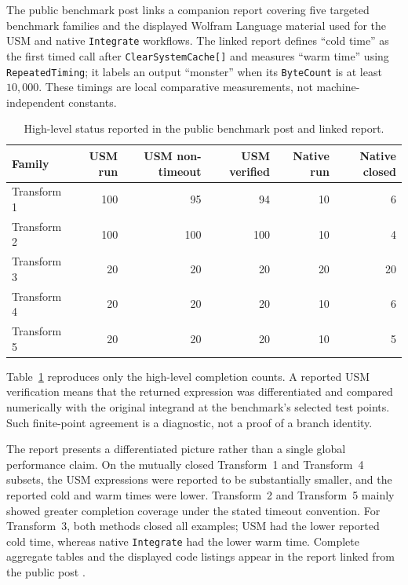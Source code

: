 \documentclass[11pt]{article}
\theoremstyle{remark}
\begin{document}
The public benchmark post \cite{GarciaBenchmark} links a companion report covering five targeted benchmark families and the displayed Wolfram Language material used for the USM and native \texttt{Integrate} workflows. The linked report defines ``cold time'' as the first timed call after \texttt{ClearSystemCache[]} and measures ``warm time'' using \texttt{RepeatedTiming}; it labels an output ``monster'' when its \texttt{ByteCount} is at least $10{,}000$. These timings are local comparative measurements, not machine-independent constants.

\begin{table}[htbp]
\centering
\caption{High-level status reported in the public benchmark post and linked report.}
\label{tab:benchmark}
\begin{tabular}{lrrrrr}
\toprule
Family & USM run & USM non-timeout & USM verified & Native run & Native closed\\
\midrule
Transform 1 & 100 & 95 & 94 & 10 & 6\\
Transform 2 & 100 & 100 & 100 & 10 & 4\\
Transform 3 & 20 & 20 & 20 & 20 & 20\\
Transform 4 & 20 & 20 & 20 & 10 & 6\\
Transform 5 & 20 & 20 & 20 & 10 & 5\\
\bottomrule
\end{tabular}
\end{table}

Table~\ref{tab:benchmark} reproduces only the high-level completion counts. A reported USM verification means that the returned expression was differentiated and compared numerically with the original integrand at the benchmark's selected test points. Such finite-point agreement is a diagnostic, not a proof of a branch identity.

The report presents a differentiated picture rather than a single global performance claim. On the mutually closed Transform~1 and Transform~4 subsets, the USM expressions were reported to be substantially smaller, and the reported cold and warm times were lower. Transform~2 and Transform~5 mainly showed greater completion coverage under the stated timeout convention. For Transform~3, both methods closed all examples; USM had the lower reported cold time, whereas native \texttt{Integrate} had the lower warm time. Complete aggregate tables and the displayed code listings appear in the report linked from the public post \cite{GarciaBenchmark}.
\end{document}
